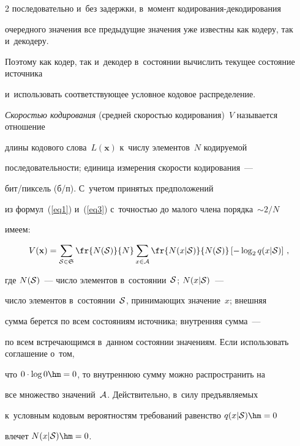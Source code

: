 \begin{multicols}{2}
последовательно и~без задержки, в~момент ко\-ди\-ро\-ва\-ния-де\-ко\-ди\-ро\-ва\-ния 

очередного значения все предыдущие значения уже известны как кодеру, так и~декодеру. 

Поэтому как кодер, так и~декодер в~состоянии вычислить текущее состояние источника 

и~использовать соответствующее условное кодовое распределение.



\textit{Скоростью кодирования} (средней скоростью кодирования)~$V$ называется отношение 

длины кодового слова~$L(\mathbf{x})$ к~числу элементов~$N$ кодируемой 

последовательности; единица измерения скорости кодирования~--- 

бит/пик\-сель (б/п). С~учетом принятых предположений 

из формул~(\ref{eq1}) и~(\ref{eq3}) с~точностью до малого члена порядка~$\sim 2/N$ 

имеем:

\begin{equation}

\label{eq4}

V(\mathbf{x}) = \sum\limits_{{\cal S}\in{\frak S}}\fr{N({\cal S})}{N}

\sum\limits_{x\in{\cal A}}\fr{N(x|{\cal S})}{N({\cal S})} 

\left[-\log_{2}q(x|{\cal S})\right]\,,

\end{equation}

где $N({\cal S})$~--- число элементов в~состоянии~${\cal S}$; $N(x|{\cal S})$~--- 

число элементов в~состоянии~${\cal S}$, принимающих значение~$x$; внешняя 

сумма берется по всем состояниям источника; внутренняя сумма~--- 

по всем встречающимся в~данном состоянии значениям. Если использовать соглашение о~том, 

что $0\cdot\log0\hm=0$, то внутреннюю сумму можно распространить на 

все множество значений~$\cal A$. Действительно, в~силу предъявляемых 

к~условным кодовым вероятностям требований равенство $q(x|{\cal S})\hm=0$ 

влечет $N(x|{\cal S})\hm=0$.




\end{multicols}
